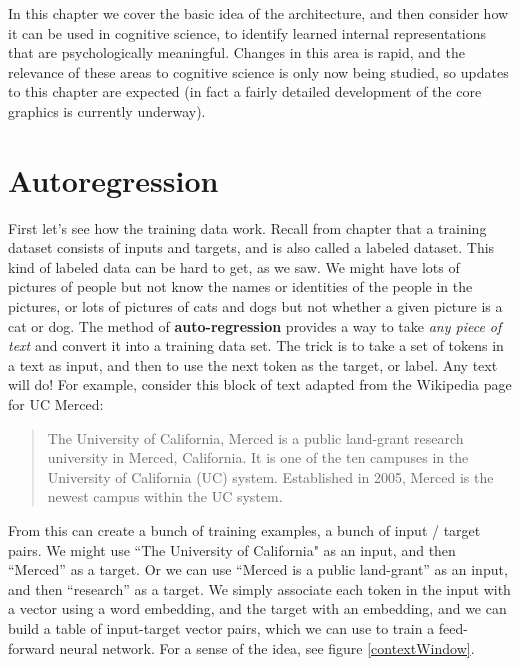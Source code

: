 
In this chapter we cover the basic idea of the architecture, and then consider how it can be used in cognitive science, to identify learned internal representations that are psychologically meaningful. Changes in this area is rapid, and the relevance of these areas to cognitive science is only now being studied, so updates to this chapter are expected (in fact a fairly detailed development of the core graphics is currently underway).

\section{Autoregression}

First let's see how the training data work. Recall from chapter  that a training dataset consists of inputs and targets, and is also called a labeled dataset. This kind of labeled data can be hard to get, as we saw.  We might have lots of pictures of people but not know the names or identities of the people in the pictures, or lots of pictures of cats and dogs but not whether a given picture is a cat or dog.  The method of  \textbf{auto-regression} provides a way to take \emph{any piece of text} and convert it into a training data set. The trick is to take a set of tokens in a text as input, and then to use the next token as the target, or label.  Any text will do! For example, consider this block of text adapted from the Wikipedia page for UC Merced:

\begin{quote}
The University of California, Merced is a public land-grant research university in Merced, California. It is one of the ten campuses in the University of California (UC) system. Established in 2005, Merced is the newest campus within the UC system.
\end{quote}

From this can create a bunch of training examples, a bunch of input / target pairs. We might use ``The University of California" as an input, and then ``Merced'' as a target. Or we can use ``Merced is a public land-grant'' as an input, and then ``research'' as a target.  We simply associate each token in the input with a vector using a word embedding, and the target with an embedding, and we can build a table of input-target vector pairs, which we can use to train a feed-forward neural network.  For a sense of the idea, see figure \ref{contextWindow}. 

